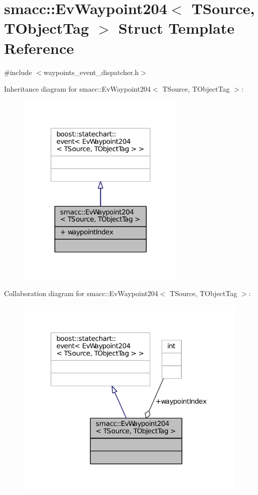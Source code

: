 \hypertarget{structsmacc_1_1EvWaypoint204}{}\section{smacc\+:\+:Ev\+Waypoint204$<$ T\+Source, T\+Object\+Tag $>$ Struct Template Reference}
\label{structsmacc_1_1EvWaypoint204}


{\ttfamily \#include $<$waypoints\+\_\+event\+\_\+dispatcher.\+h$>$}



Inheritance diagram for smacc\+:\+:Ev\+Waypoint204$<$ T\+Source, T\+Object\+Tag $>$\+:
\nopagebreak
\begin{figure}[H]
\begin{center}
\leavevmode
\includegraphics[width=227pt]{structsmacc_1_1EvWaypoint204__inherit__graph}
\end{center}
\end{figure}


Collaboration diagram for smacc\+:\+:Ev\+Waypoint204$<$ T\+Source, T\+Object\+Tag $>$\+:
\nopagebreak
\begin{figure}[H]
\begin{center}
\leavevmode
\includegraphics[width=312pt]{structsmacc_1_1EvWaypoint204__coll__graph}
\end{center}
\end{figure}
